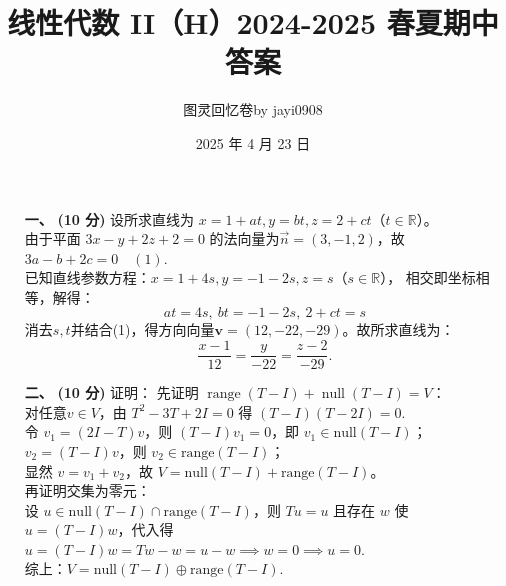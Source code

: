 \documentclass{ctexart}
\title{\vspace{-4em}\textbf{线性代数 II（H）2024-2025 春夏期中答案}}
\author{图灵回忆卷\quad\quad by jayi0908}
\date{2025 年 4 月 23 日}
\begin{document}
\maketitle

\begin{enumerate}
    \item[\textbf{一、}] \textbf{(10 分)} 设所求直线为 \(x=1+at, y=bt, z=2+ct\)（\(t\in\mathbb{R}\)）。  \\
    由于平面 \(3x - y + 2z + 2 = 0\) 的法向量为\(\overrightarrow{n}=(3,-1,2)\)，故 $3a - b + 2c = 0 \quad (1)$. \\
    已知直线参数方程：\(x=1+4s, y=-1-2s, z=s\)（\(s\in\mathbb{R}\)），  
    相交即坐标相等，解得：  
    \[at=4s,\ bt=-1-2s,\ 2+ct=s\]  
    消去\(s,t\)并结合(1)，得方向向量\(\boldsymbol{v}=(12,-22,-29)\)。故所求直线为：
    \[\dfrac{x-1}{12}=\dfrac{y}{-22}=\dfrac{z-2}{-29}.\]

    \item[\textbf{二、}] \textbf{(10 分)} 证明：
    先证明 $\operatorname{range}(T-I) + \operatorname{null}(T-I) = V$：\\
    对任意\(v\in V\)，由 \(T^2 - 3T + 2I = 0\) 得 \((T - I)(T - 2I) = 0\). \\
    令 \(v_1=(2I-T)v\)，则 \((T-I)v_1=0\)，即 \(v_1\in\text{null}(T - I)\)；
    \(v_2=(T-I)v\)，则 \(v_2\in\text{range}(T - I)\)； \\
    显然 \(v = v_1 + v_2\)，故 \(V = \text{null}(T - I) + \text{range}(T - I)\)。 \\
    再证明交集为零元：\\
    设 \(u\in\text{null}(T - I) \cap \text{range}(T - I)\)，则 \(Tu = u\) 且存在 \(w\) 使 \(u=(T - I)w\)，代入得 \(u=(T-I)w=Tw-w=u-w \implies w=0 \implies u=0\). \\
    综上：$V = \text{null}(T - I) \oplus \text{range}(T - I)$.
    

\end{enumerate}
\end{document}
